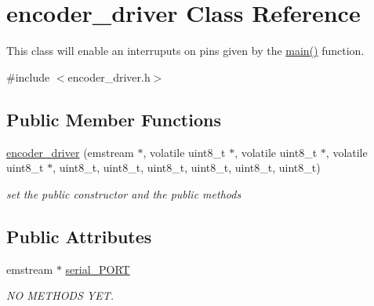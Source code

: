 \hypertarget{classencoder__driver}{\section{encoder\-\_\-driver Class Reference}
\label{classencoder__driver}
}


This class will enable an interruputs on pins given by the \hyperlink{main_8cpp_a840291bc02cba5474a4cb46a9b9566fe}{main()} function.  




{\ttfamily \#include $<$encoder\-\_\-driver.\-h$>$}

\subsection*{Public Member Functions}
\begin{DoxyCompactItemize}
\item 
\hypertarget{classencoder__driver_a9dc07f5c4a55511ea7993b83249af86d}{\hyperlink{classencoder__driver_a9dc07f5c4a55511ea7993b83249af86d}{encoder\-\_\-driver} (emstream $\ast$, volatile uint8\-\_\-t $\ast$, volatile uint8\-\_\-t $\ast$, volatile uint8\-\_\-t $\ast$, uint8\-\_\-t, uint8\-\_\-t, uint8\-\_\-t, uint8\-\_\-t, uint8\-\_\-t, uint8\-\_\-t)}\label{classencoder__driver_a9dc07f5c4a55511ea7993b83249af86d}

\begin{DoxyCompactList}\small\item\em set the public constructor and the public methods \end{DoxyCompactList}\end{DoxyCompactItemize}
\subsection*{Public Attributes}
\begin{DoxyCompactItemize}
\item 
\hypertarget{classencoder__driver_a7dd2fe40b4c20d9741706f26b3dac173}{emstream $\ast$ \hyperlink{classencoder__driver_a7dd2fe40b4c20d9741706f26b3dac173}{serial\-\_\-\-P\-O\-R\-T}}\label{classencoder__driver_a7dd2fe40b4c20d9741706f26b3dac173}

\begin{DoxyCompactList}\small\item\em N\-O M\-E\-T\-H\-O\-D\-S Y\-E\-T. \end{DoxyCompactList}\end{DoxyCompactItemize}
